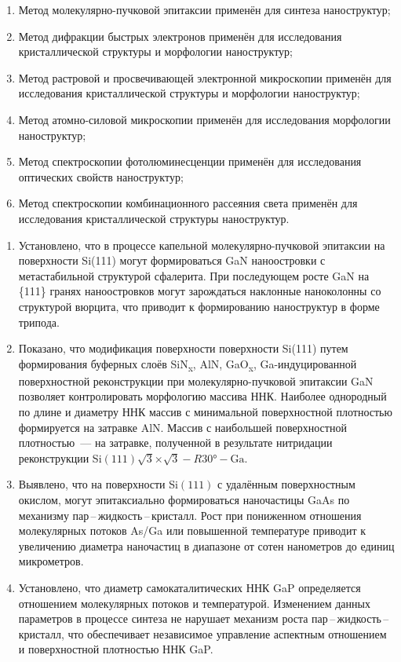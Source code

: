 {\methods}
\begin{enumerate}[beginpenalty=10000]
  \item Метод молекулярно-пучковой эпитаксии применён для синтеза наноструктур;
  \item Метод дифракции быстрых электронов применён для исследования кристаллической структуры и морфологии наноструктур;
  \item Метод растровой и просвечивающей электронной микроскопии применён для исследования кристаллической структуры и морфологии наноструктур;
  \item Метод атомно-силовой микроскопии применён для исследования морфологии наноструктур;
  \item Метод спектроскопии фотолюминесценции применён для исследования оптических свойств наноструктур;
  \item Метод спектроскопии комбинационного рассеяния света применён для исследования кристаллической структуры наноструктур.
\end{enumerate}

{} \begin{enumerate}[beginpenalty=10000] 
\item Установлено, что в процессе капельной молекулярно-пучковой эпитаксии на
поверхности Si(111) могут формироваться GaN наноостровки с метастабильной
структурой сфалерита. При последующем росте GaN
на \{111\} гранях наноостровков могут зарождаться наклонные наноколонны со
структурой вюрцита, что приводит к формированию наноструктур в форме
трипода.
\item Показано, что модификация поверхности поверхности Si(111) путем формирования буферных слоёв SiN\textsubscript{x}, AlN, GaO\textsubscript{x}, Ga-индуцированной поверхностной реконструкции при молекулярно-пучковой эпитаксии GaN позволяет контролировать морфологию массива ННК. Наиболее однородный по длине и диаметру ННК массив с минимальной поверхностной плотностью
формируется на затравке AlN. Массив с наибольшей поверхностной плотностью~--- на затравке, полученной в результате нитридации реконструкции
Si\((111)\sqrt{3}\)\(\times\)\(\sqrt{3} - R30\si{\degree} - \text{Ga}\).
\item Выявлено, что на поверхности Si\((111)\) с
удалённым поверхностным окислом, могут эпитаксиально формироваться наночастицы GaAs по механизму пар\,--\,жидкость\,--\,кристалл. Рост при пониженном
отношения молекулярных потоков As/Ga или повышенной температуре приводит к
увеличению диаметра наночастиц в диапазоне от сотен нанометров до единиц
микрометров.
\item Установлено, что диаметр самокаталитических ННК GaP определяется
отношением молекулярных потоков и температурой. Изменением данных
параметров в процессе синтеза не нарушает механизм роста
пар\,--\,жидкость\,--\,кристалл, что обеспечивает независимое управление
аспектным отношением и поверхностной плотностью ННК GaP.
\end{enumerate}

